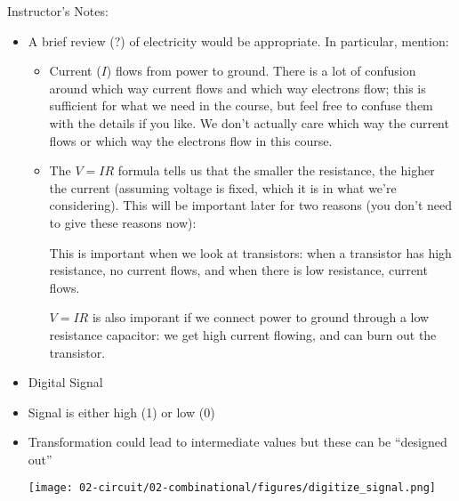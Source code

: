 \begin{frame}[fragile]
Instructor's Notes:
\begin{itemize}
	\item A brief review (?) of electricity would be appropriate.
		In particular, mention:
		\begin{itemize}
			\item Current ($I$) flows from power to ground.  There 
				is a lot of confusion around which way current
				flows and which way electrons flow; this is
				sufficient for what we need in the course, but
				feel free to confuse them with the details
				if you like.  We don't actually care which
				way the current flows or which way the
				electrons flow in this course.
			\item The $V=IR$ formula tells us that the smaller
				the resistance, the higher the current
				(assuming voltage is fixed, which it is
				in what we're considering).  This will be
				important later for two reasons (you don't
				need to give these reasons now):

				This is important when we look at transistors:
				when a transistor has high resistance, no 
				current flows, and when there is low resistance,
				current flows.

				$V=IR$ is also imporant if we connect power
				to ground through a low resistance capacitor:
				we get high current flowing, and can burn
				out the transistor.
		\end{itemize}
\end{itemize}
\end{frame}
\fi\ENotes

\begin{frame}[fragile]
\begin{itemize}
	\item Digital Signal


	\item Signal is either high (1) or low (0)
	\item Transformation could lead to intermediate values but these can be ``designed out''
\begin{multicols}{2}
  \columnbreak
  \texttt{[image: 02-circuit/02-combinational/figures/digitize\_signal.png]}
\end{multicols}


		
\end{itemize}
\end{frame}

